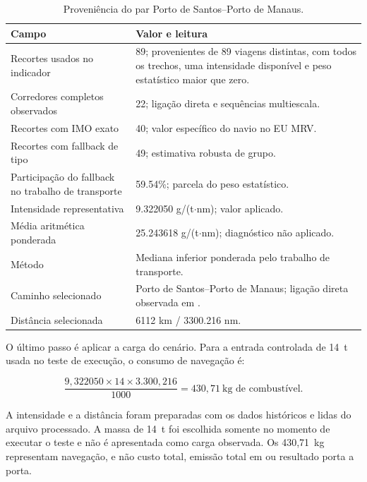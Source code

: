 \begin{table}[htbp]
\centering
\small
\caption{Proveniência do par Porto de Santos--Porto de Manaus.}
\label{tab:app-santos-manaus}
\begin{tabularx}{\textwidth}{L{0.37\textwidth}Y}
\toprule
Campo & Valor e leitura \\
\midrule
Recortes usados no indicador & \num{89}; provenientes de 89 viagens distintas, com todos os trechos, uma intensidade disponível e peso estatístico maior que zero. \\
Corredores completos observados & \num{22}; ligação direta e sequências multiescala. \\
Recortes com IMO exato & \num{40}; valor específico do navio no EU MRV. \\
Recortes com fallback de tipo & \num{49}; estimativa robusta de grupo. \\
Participação do fallback no trabalho de transporte & \num{59.54}\%; parcela do peso estatístico. \\
Intensidade representativa & \num{9.322050} g/(t$\cdot$nm); valor aplicado. \\
Média aritmética ponderada & \num{25.243618} g/(t$\cdot$nm); diagnóstico não aplicado. \\
Método & Mediana inferior ponderada pelo trabalho de transporte. \\
Caminho selecionado & Porto de Santos--Porto de Manaus; ligação direta observada em . \\
Distância selecionada & \num{6112} km / \num{3300.216} nm. \\
\bottomrule
\end{tabularx}
\end{table}

O último passo é aplicar a carga do cenário. Para a entrada controlada de 14~t usada no teste de execução, o consumo de navegação é:

\begin{equation}
\frac{9{,}322050\times14\times3.300{,}216}{1000}
= 430{,}71~\text{kg de combustível}.
\end{equation}

A intensidade e a distância foram preparadas com os dados históricos e lidas do arquivo processado. A massa de 14~t foi escolhida somente no momento de executar o teste e não é apresentada como carga observada. Os 430,71~kg representam navegação, e não custo total, emissão total em \cooe{} ou resultado porta a porta.

